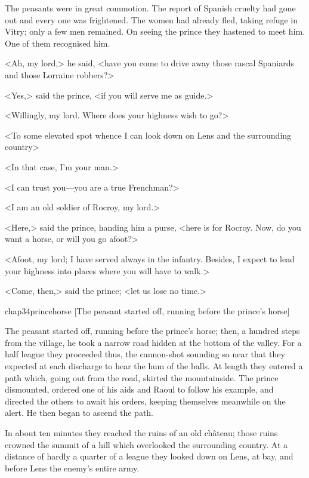 The peasants were in great commotion. The report of Spanish cruelty had gone out and every one was frightened. The women had already fled, taking refuge in Vitry; only a few men remained. On seeing the prince they hastened to meet him. One of them recognised him.

<Ah, my lord,> he said, <have you come to drive away those rascal Spaniards and those Lorraine robbers?>

<Yes,> said the prince, <if you will serve me as guide.>

<Willingly, my lord. Where does your highness wish to go?>

<To some elevated spot whence I can look down on Lens and the surrounding country\longdash>

<In that case, I'm your man.>

<I can trust you—you are a true Frenchman?>

<I am an old soldier of Rocroy, my lord.>

<Here,> said the prince, handing him a purse, <here is for Rocroy. Now, do you want a horse, or will you go afoot?>

<Afoot, my lord; I have served always in the infantry. Besides, I expect to lead your highness into places where you will have to walk.>

<Come, then,> said the prince; <let us lose no time.>

\begin{bwbigpic}
	[\basicscale] 
	{chap34princehorse}
	[The peasant started off, running before the prince's horse]
\end{bwbigpic}

The peasant started off, running before the prince's horse; then, a hundred steps from the village, he took a narrow road hidden at the bottom of the valley. For a half league they proceeded thus, the cannon-shot sounding so near that they expected at each discharge to hear the hum of the balls. At length they entered a path which, going out from the road, skirted the mountainside. The prince dismounted, ordered one of his aids and Raoul to follow his example, and directed the others to await his orders, keeping themselves meanwhile on the alert. He then began to ascend the path.

In about ten minutes they reached the ruins of an old château; those ruins crowned the summit of a hill which overlooked the surrounding country. At a distance of hardly a quarter of a league they looked down on Lens, at bay, and before Lens the enemy's entire army.

